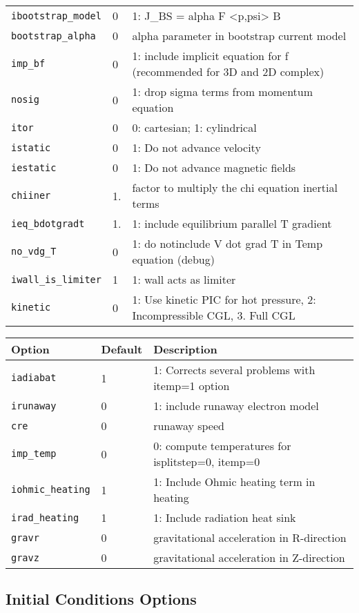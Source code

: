 \begin{tabular}{llp{4in}}
  \texttt{ibootstrap\_model} & 0 & 1: J\_BS = alpha F <p,psi> B \\
  \texttt{bootstrap\_alpha} & 0 & alpha parameter in bootstrap current model \\
  \texttt{imp\_bf} & 0 & 1: include implicit equation for f (recommended for
  3D and 2D complex) \\
  \texttt{nosig} & 0 & 1: drop sigma terms from momentum equation \\
  \texttt{itor}   & 0   & 0: cartesian; 1: cylindrical\\
  \texttt{istatic}& 0   & 1: Do not advance velocity\\
  \texttt{iestatic}&0   & 1: Do not advance magnetic fields\\
  \texttt{chiiner} & 1. & factor to multiply the chi equation inertial terms \\
  \texttt{ieq\_bdotgradt} & 1. & 1: include equilibrium parallel T gradient \\
  \texttt{no\_vdg\_T} & 0 & 1: do notinclude V dot grad T in Temp equation (debug) \\
  \texttt{iwall\_is\_limiter} & 1 & 1: wall acts as limiter \\
  \texttt{kinetic} & 0 & 1: Use kinetic PIC for hot pressure, 
                         2: Incompressible CGL,
                         3. Full CGL  
\end{tabular}

\begin{tabular}{llp{4in}}
  \textbf{Option}&\textbf{Default}&\textbf{Description}\\
  \hline
  \texttt{iadiabat} & 1 & 1: Corrects several problems with itemp=1 option \\
  \texttt{irunaway} & 0 & 1:  include runaway electron model \\
  \texttt{cre} & 0 & runaway speed \\
  \texttt{imp\_temp} & 0 & 0: compute temperatures for isplitstep=0, itemp=0 \\
  \texttt{iohmic\_heating} & 1 & 1: Include Ohmic heating term in heating \\
  \texttt{irad\_heating} & 1 & 1: Include radiation heat sink \\
  \texttt{gravr} & 0 & gravitational acceleration in R-direction \\
  \texttt{gravz} & 0 & gravitational acceleration in Z-direction 
\end{tabular}

\subsection{Initial Conditions Options}

